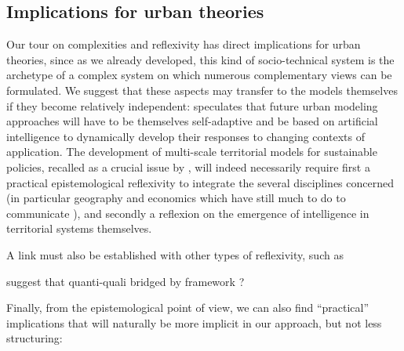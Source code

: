 \subsection{Implications for urban theories}


Our tour on complexities and reflexivity has direct implications for urban theories, since as we already developed, this kind of socio-technical system is the archetype of a complex system on which numerous complementary views can be formulated. We suggest that these aspects may transfer to the models themselves if they become relatively independent: \cite{white2017necessity} speculates that future urban modeling approaches will have to be themselves self-adaptive and be based on artificial intelligence to dynamically develop their responses to changing contexts of application. The development of multi-scale territorial models for sustainable policies, recalled as a crucial issue by \cite{rozenblat2018conclusion}, will indeed necessarily require first a practical epistemological reflexivity to integrate the several disciplines concerned (in particular geography and economics which have still much to do to communicate \cite{raimbault2017invisible}), and secondly a reflexion on the emergence of intelligence in territorial systems themselves.

A link must also be established with other types of reflexivity, such as \cite{anzoise2017perception}



\cite{shah2006building} suggest that  quanti-quali bridged by framework ?




Finally, from the epistemological point of view, we can also find ``practical'' implications that will naturally be more implicit in our approach, but not less structuring:

